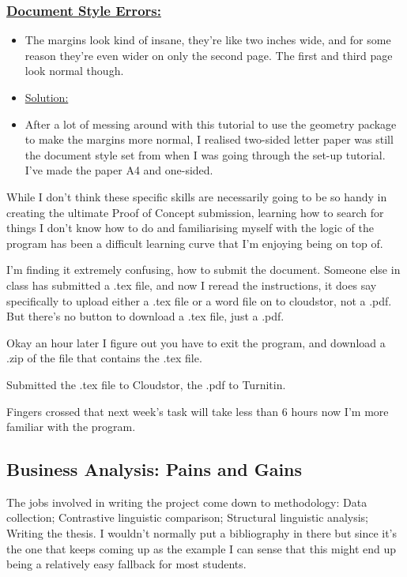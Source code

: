 \documentclass[12pt]{article}
\begin{document}
\subsubsection{\underline{Document Style Errors:}}\label{error:er5}
\begin{itemize}
    \item The margins look kind of insane, they’re like two inches wide, and for some reason they’re even wider on only the second page. The first and third page look normal though.
\end{itemize}
\begin{itemize}
\renewcommand{\labelitemi}{$\nobullet$}
\item \underline{Solution:}
\renewcommand{\labelitemi}{$\bullet$}
    \item After a lot of messing around with this tutorial to use the geometry package to make the margins more normal, I realised two-sided letter paper was still the document style set from when I was going through the set-up tutorial. I’ve made the paper A4 and one-sided.
\end{itemize}

While I don’t think these specific skills are necessarily going to be so handy in creating the ultimate Proof of Concept submission, learning how to search for things I don’t know how to do and familiarising myself with the logic of the program has been a difficult learning curve that I’m enjoying being on top of.

I’m finding it extremely confusing, how to submit the document. Someone else in class has submitted a .tex file, and now I reread the instructions, it does say specifically to upload either a .tex file or a word file on to cloudstor, not a .pdf. But there’s no button to download a .tex file, just a .pdf.

Okay an hour later I figure out you have to exit the program, and download a .zip of the file that contains the .tex file. 

Submitted the .tex file to Cloudstor, the .pdf to Turnitin.

Fingers crossed that next week’s task will take less than 6 hours now I’m more familiar with the program.

\subsection{Business Analysis: Pains and Gains}
The jobs involved in writing the project come down to methodology: Data collection; Contrastive linguistic comparison; Structural linguistic analysis; Writing the thesis. I wouldn't normally put a bibliography in there but since it's the one that keeps coming up as the example I can sense that this might end up being a relatively easy fallback for most students.
\end{document}

